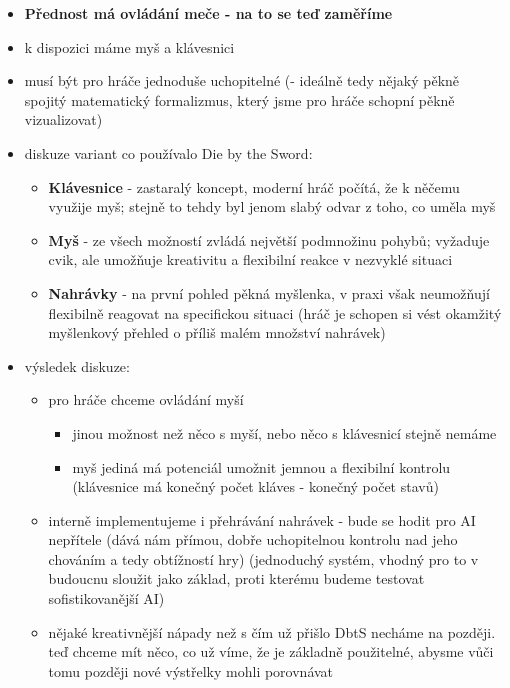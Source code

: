 \begin{itemize}
    \item \textbf{Přednost má ovládání meče - na to se teď zaměříme}
    \item k dispozici máme myš a klávesnici
    \item musí být pro hráče jednoduše uchopitelné (- ideálně tedy nějaký pěkně spojitý matematický formalizmus, který jsme pro hráče schopní pěkně vizualizovat)
    \item diskuze variant co používalo Die by the Sword:
        \begin{itemize}
            \item \textbf{Klávesnice} - zastaralý koncept, moderní hráč počítá, že k něčemu využije myš; stejně to tehdy byl jenom slabý odvar z toho, co uměla myš
            \item \textbf{Myš} - ze všech možností zvládá největší podmnožinu pohybů; vyžaduje cvik, ale umožňuje kreativitu a flexibilní reakce v nezvyklé situaci
            \item \textbf{Nahrávky} - na první pohled pěkná myšlenka, v praxi však neumožňují flexibilně reagovat na specifickou situaci (hráč je schopen si vést okamžitý myšlenkový přehled o příliš malém množství nahrávek)
        \end{itemize}
    \item výsledek diskuze:
        \begin{itemize}
            \item pro hráče chceme ovládání myší
            \begin{itemize}
                \item jinou možnost než něco s myší, nebo něco s klávesnicí stejně nemáme
                \item myš jediná má potenciál umožnit jemnou a flexibilní kontrolu (klávesnice má konečný počet kláves - konečný počet stavů)
            \end{itemize}
            \item interně implementujeme i přehrávání nahrávek - bude se hodit pro AI nepřítele (dává nám přímou, dobře uchopitelnou kontrolu nad jeho chováním a tedy obtížností hry) (jednoduchý systém, vhodný pro to v budoucnu sloužit jako základ, proti kterému budeme testovat sofistikovanější AI)
            \item nějaké kreativnější nápady než s čím už přišlo DbtS necháme na později. teď chceme mít něco, co už víme, že je základně použitelné, abysme vůči tomu později nové výstřelky mohli porovnávat

\end{itemize}
\end{itemize}
